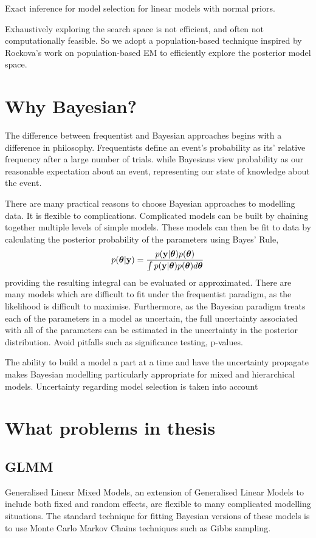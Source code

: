 Exact inference for model selection for linear models with normal priors.



Exhaustively exploring the search space is not efficient, and often not computationally feasible. So we adopt
a population-based technique inspired by Rockova's work on population-based EM to efficiently explore the
posterior model space.

\section{Why Bayesian?}
The difference between frequentist and Bayesian approaches begins with a difference in philosophy.
Frequentists define an event's probability as its' relative frequency after a large number of trials.
while Bayesians view probability as our reasonable expectation about an event, representing our state of knowledge about the event.

There are many practical reasons to choose Bayesian approaches to modelling data.
It is flexible to complications. Complicated models can be built by chaining together multiple levels of
simple models. These models can then be fit to data by calculating the posterior probability of the
parameters using Bayes' Rule,
\[
	p({\boldsymbol \theta} | {\bf y}) = \frac{p({\bf y} | {\boldsymbol \theta}) p({\boldsymbol \theta})}{\int p({\bf y} | {\boldsymbol \theta}) p({\boldsymbol \theta}) d {\boldsymbol \theta}}
\]
providing the resulting integral can be evaluated or approximated. There are many models which are difficult to
fit under the frequentist paradigm, as the likelihood is difficult to maximise.
Furthermore, as the Bayesian paradigm treats each of the parameters in a model as uncertain, the full
uncertainty associated with all of the parameters can be estimated in the uncertainty in the posterior distribution.
Avoid pitfalls such as significance testing, p-values.
\citep{Janes2014}

The ability to build a model a part at a time and have the uncertainty propagate makes Bayesian modelling 
particularly appropriate for mixed and hierarchical models.
Uncertainty regarding model selection is taken into account

\section{What problems in thesis}
\subsection{GLMM}
Generalised Linear Mixed Models, an extension of Generalised Linear Models to include both fixed and
random effects, are flexible to many complicated modelling situations. The standard technique for fitting
Bayesian versions of these models is to use Monte Carlo Markov Chains techniques such as Gibbs sampling.

